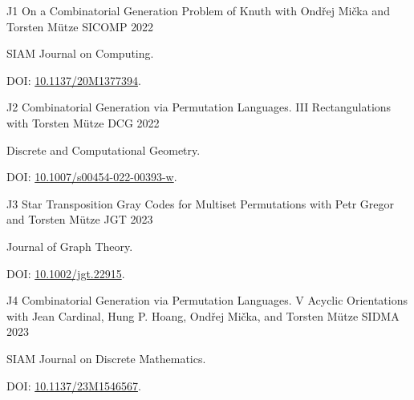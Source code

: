 



\vspace{2 mm}
\vspace{2 mm}

\begin{cvpublications}
  \cvpublication
  {J1}
  {On a Combinatorial Generation Problem of Knuth} %
  {with Ondřej Mička and Torsten Mütze} %
  {SICOMP} %
  {2022}
  {
  \begin{cvitems} %
    \item   SIAM Journal on Computing.
    \item[] DOI: \href{https://doi.org/10.1137/20M1377394}{10.1137/20M1377394}.
  \end{cvitems}
  }

  \cvpublication
  {J2}
  {Combinatorial Generation via Permutation Languages. III Rectangulations} %
  {with Torsten Mütze} %
  {DCG} %
  {2022}
  {
  \begin{cvitems} %
    \item   Discrete and Computational Geometry.
    \item[] DOI: \href{https://doi.org/10.1007/s00454-022-00393-w}{10.1007/s00454-022-00393-w}.
  \end{cvitems}
  }

  \cvpublication
  {J3}
  {Star Transposition Gray Codes for Multiset Permutations} %
  {with Petr Gregor and Torsten Mütze} %
  {JGT} %
  {2023}
  {
  \begin{cvitems} %
    \item  Journal of Graph Theory.
    \item[] DOI: \href{https://doi.org/10.1002/jgt.22915}{10.1002/jgt.22915}.
  \end{cvitems}
  }

  \cvpublication
  {J4}
  {Combinatorial Generation via Permutation Languages. V Acyclic Orientations} %
  {with Jean Cardinal, Hung P. Hoang, Ondřej Mička, and Torsten Mütze} %
  {SIDMA} %
  {2023}
  {
  \begin{cvitems} %
    \item  SIAM Journal on Discrete Mathematics.
    \item[] DOI: \href{https://doi.org/10.1137/23M1546567}{10.1137/23M1546567}.
  \end{cvitems}
  }


\end{cvpublications}

